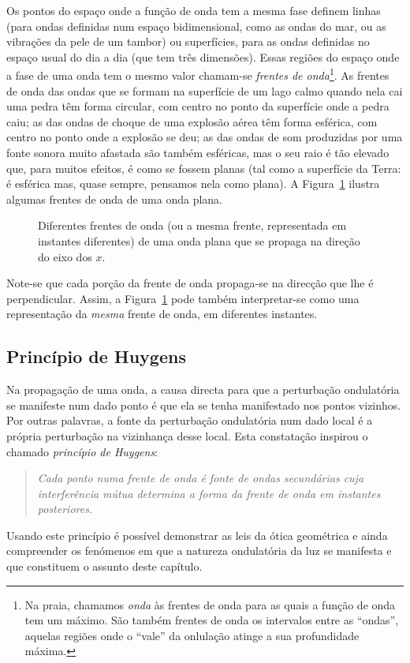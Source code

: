 Os pontos do espaço onde a função de onda tem a mesma fase definem linhas (para
ondas definidas num espaço bidimensional, como as ondas do mar, ou as vibrações
da pele de um tambor) ou superfícies, para as ondas definidas no espaço usual do
dia a dia (que tem três dimensões). Essas regiões do espaço onde a fase de uma
onda tem o mesmo valor chamam-se \emph{frentes de onda}\footnote{Na praia,
chamamos \emph{onda} às frentes de onda para as quais a função de onda tem um
máximo. São também frentes de onda os intervalos entre as ``ondas'', aquelas
regiões onde o ``vale'' da onlulação atinge a sua profundidade máxima.}. As
frentes de onda das ondas que se formam na superfície de um lago calmo quando
nela cai uma pedra têm forma circular, com centro no ponto da superfície onde a
pedra caiu; as das ondas de choque de uma explosão aérea têm forma esférica, com
centro no ponto onde a explosão se deu; as das ondas de som produzidas por uma
fonte sonora muito afastada são também esféricas, mas o seu raio é tão elevado
que, para muitos efeitos, é como se fossem planas (tal como a superfície da
Terra: é esférica mas, quase sempre, pensamos nela como plana). A
Figura~\ref{fig:oof040} ilustra algumas frentes de onda de uma onda plana.
\begin{figure}[htb]
{\centering
\caption{Diferentes frentes de onda (ou a mesma frente, representada em
instantes diferentes) de uma onda plana que se propaga na direção do eixo dos
$x$.\label{fig:oof040}}

}
\end{figure}
Note-se que cada porção da frente de onda propaga-se na direcção que lhe é
perpendicular. Assim, a Figura~\ref{fig:oof040} pode também interpretar-se como
uma representação da \emph{mesma} frente de onda, em diferentes instantes.

\subsection{Princípio de Huygens}
Na propagação de uma onda, a causa directa para que a perturbação ondulatória se
manifeste num dado ponto é que ela se tenha manifestado nos pontos vizinhos. Por
outras palavras, a fonte da perturbação ondulatória num dado local é a própria
perturbação na vizinhança desse local. Esta constatação inspirou o chamado
\emph{princípio de Huygens}:
\begin{quote}
    \textsl{Cada ponto numa frente de onda é fonte de ondas secundárias cuja
    interferência mútua determina a forma da frente de onda em instantes
    posteriores.}
\end{quote}
Usando este princípio é possível demonstrar as leis da ótica geométrica e ainda
compreender os fenómenos em que a natureza ondulatória da luz se manifesta e que
constituem o assunto deste capítulo.


